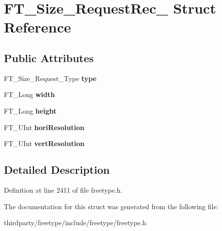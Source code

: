 \hypertarget{struct_f_t___size___request_rec__}{}\section{F\+T\+\_\+\+Size\+\_\+\+Request\+Rec\+\_\+ Struct Reference}
\label{struct_f_t___size___request_rec__}
\subsection*{Public Attributes}
\begin{DoxyCompactItemize}
\item 
\mbox{\label{struct_f_t___size___request_rec___a7644b04dd2b26c0698df558775320494}} 
F\+T\+\_\+\+Size\+\_\+\+Request\+\_\+\+Type {\bfseries type}
\item 
\mbox{\label{struct_f_t___size___request_rec___a7b044d36af318b053d5e3939eb0d5039}} 
F\+T\+\_\+\+Long {\bfseries width}
\item 
\mbox{\label{struct_f_t___size___request_rec___af8142450d8d032e1870d758cdcfa51a9}} 
F\+T\+\_\+\+Long {\bfseries height}
\item 
\mbox{\label{struct_f_t___size___request_rec___a3a85704d13561d9db53aa60f7805ec73}} 
F\+T\+\_\+\+U\+Int {\bfseries hori\+Resolution}
\item 
\mbox{\label{struct_f_t___size___request_rec___a86601c38d91064b6efe256a9e99c56f4}} 
F\+T\+\_\+\+U\+Int {\bfseries vert\+Resolution}
\end{DoxyCompactItemize}


\subsection{Detailed Description}


Definition at line 2411 of file freetype.\+h.



The documentation for this struct was generated from the following file\+:\begin{DoxyCompactItemize}
\item 
thirdparty/freetype/include/freetype/freetype.\+h\end{DoxyCompactItemize}
